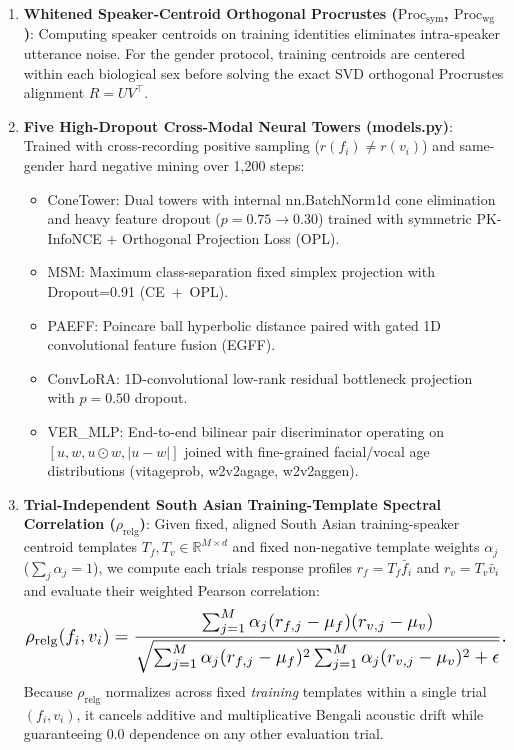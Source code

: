 \documentclass[10pt,letterpaper]{article}
\providecommand{\tightlist}{\setlength{\itemsep}{0pt}\setlength{\parskip}{0pt}}
\begin{document}
\begin{enumerate}
\def\labelenumi{\arabic{enumi}.}
\tightlist
\item
  \textbf{Whitened Speaker-Centroid Orthogonal Procrustes (\(\text{Proc}_{\text{sym}}\), \(\text{Proc}_{\text{wg}}\))}: Computing speaker centroids on training identities eliminates intra-speaker utterance noise. For the \textnormal{gender} protocol, training centroids are centered within each biological sex before solving the exact SVD orthogonal Procrustes alignment \(R = U V^\top\).
\item
  \textbf{Five High-Dropout Cross-Modal Neural Towers (\textnormal{models.py})}: Trained with cross-recording positive sampling (\(r(f_i) \neq r(v_i)\)) and same-gender hard negative mining over 1,200 steps:

  \begin{itemize}
  \tightlist
  \item
    \textnormal{ConeTower}: Dual towers with internal \textnormal{nn.BatchNorm1d} cone elimination and heavy feature dropout (\(p=0.75 \rightarrow 0.30\)) trained with symmetric PK-InfoNCE + Orthogonal Projection Loss (\textnormal{OPL}).
  \item
    \textnormal{MSM}: Maximum class-separation fixed simplex projection with \textnormal{Dropout=0.91} (\textnormal{CE\ +\ OPL}).
  \item
    \textnormal{PAEFF}: Poincare ball hyperbolic distance paired with gated 1D convolutional feature fusion (\textnormal{EGFF}).
  \item
    \textnormal{ConvLoRA}: 1D-convolutional low-rank residual bottleneck projection with \(p=0.50\) dropout.
  \item
    \textnormal{VER\_\allowbreak{}MLP}: End-to-end bilinear pair discriminator operating on \([u, w, u \odot w, |u - w|]\) joined with fine-grained facial/vocal age distributions (\textnormal{vitageprob}, \textnormal{w2v2agage}, \textnormal{w2v2aggen}).
  \end{itemize}
\item
  \textbf{Trial-Independent South Asian Training-Template Spectral Correlation (\(\rho_{\text{relg}}\))}: Given fixed, aligned South Asian training-speaker centroid templates \(T_f, T_v \in \mathbb{R}^{M \times d}\) and fixed non-negative template weights \(\alpha_j\) (\(\sum_j \alpha_j = 1\)), we compute each trial\textquotesingle s response profiles \(r_f = T_f \bar{f}_i\) and \(r_v = T_v \bar{v}_i\) and evaluate their weighted Pearson correlation: \[\resizebox{\linewidth}{!}{$\displaystyle \rho_{\text{relg}}(f_i, v_i) = \frac{\sum_{j=1}^M \alpha_j (r_{f,j} - \mu_f)(r_{v,j} - \mu_v)}{\sqrt{\sum_{j=1}^M \alpha_j (r_{f,j} - \mu_f)^2 \sum_{j=1}^M \alpha_j (r_{v,j} - \mu_v)^2 + \epsilon}}.$}\] Because \(\rho_{\text{relg}}\) normalizes across fixed \emph{training} templates within a single trial \((f_i, v_i)\), it cancels additive and multiplicative Bengali acoustic drift while guaranteeing \(0.0\) dependence on any other evaluation trial.
\end{enumerate}
\end{document}
